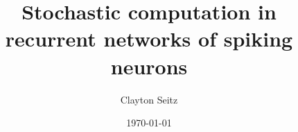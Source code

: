 \documentclass[aspectratio=169]{beamer}
\begin{document}
\title{Stochastic computation in recurrent networks of spiking neurons}  
\author{Clayton Seitz}
\date{\today} 

\maketitle


\begin{frame}

\end{frame}




\begin{thebibliography}{99} 
\end{thebibliography}
\end{document}
